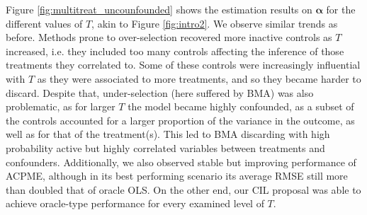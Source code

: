\documentclass[12pt]{article}
\def\cred{\textcolor{red}}
\newcommand{\balpha}{{\bm{\alpha}}}
\begin{document}
Figure \ref{fig:multitreat_uncounfounded} shows the estimation results on $\balpha$ for the different values of $T$, akin to Figure \ref{fig:intro2}. We observe similar trends as before. Methods prone to over-selection recovered more inactive controls as $T$ increased, i.e. they included too many controls affecting the inference of those treatments they correlated to. Some of these controls were increasingly influential with $T$ as they were associated to more treatments, and so they became harder to discard. Despite that, under-selection (here suffered by BMA) was also problematic, as for larger $T$ the model became highly confounded, as a subset of the controls accounted for a larger proportion of the variance in the outcome, as well as for that of the treatment(s). This led to BMA discarding with high probability active but highly correlated variables between treatments and confounders. Additionally, we also observed stable but improving performance of ACPME, although in its best performing scenario its average RMSE still more than doubled that of oracle OLS. On the other end, our CIL proposal was able to achieve oracle-type performance for every examined level of $T$.

\end{document}
